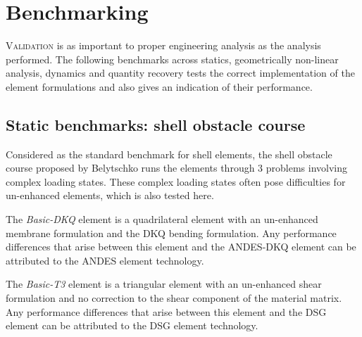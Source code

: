 


\chapter{Benchmarking}

\renewcommand{\Thema}{Benchmarking}

\lettrine[lines=2]{V}{alidation} is as important to proper engineering analysis as the analysis performed. The following benchmarks across statics, geometrically non-linear analysis, dynamics and quantity recovery tests the correct implementation of the element formulations and also gives an indication of their performance. 

\section{Static benchmarks: shell obstacle course}

Considered as the standard benchmark for shell elements, the shell obstacle course proposed by Belytschko \cite{Bel85} runs the elements through 3 problems involving complex loading states. These complex loading states often pose difficulties for un-enhanced elements, which is also tested here.

The \textit{Basic-DKQ} element is a quadrilateral element with an un-enhanced membrane formulation and the DKQ bending formulation. Any performance differences that arise between this element and the ANDES-DKQ element can be attributed to the ANDES element technology.

The \textit{Basic-T3} element is a triangular element with an un-enhanced shear formulation and no correction to the shear component of the material matrix. Any performance differences that arise between this element and the DSG element can be attributed to the DSG element technology.

